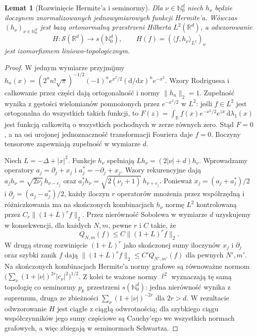 \documentclass[11pt,a4paper]{article}
\numberwithin{equation}{section}
\theoremstyle{plain}
\newtheorem{lemat}[twierdzenie]{Lemat}
\theoremstyle{definition}
\theoremstyle{remark}
\newcommand{\R}{\mathbb R}
\newcommand{\N}{\mathbb N}
\begin{document}
\begin{lemat}[Rozwinięcie Hermite'a i seminormy]
\label{lem:hermite-schwartz23}
Dla $\nu\in\N_0^d$ niech $h_\nu$ będzie iloczynem
znormalizowanych jednowymiarowych funkcji Hermite'a.
Wówczas $(h_\nu)_{\nu\in\N_0^d}$ jest bazą ortonormalną
przestrzeni Hilberta $L^2(\R^d)$, a odwzorowanie
\[
 H:\mathcal S(\R^d)\to s(\N_0^d),\qquad
 H(f)=(\langle f,h_\nu\rangle_{L^2})_\nu
\]
jest izomorfizmem liniowo-topologicznym.
\end{lemat}
\begin{proof}
W jednym wymiarze przyjmijmy
$h_n(x)=(2^n n!\sqrt\pi)^{-1/2}
(-1)^n e^{x^2/2}(\mathrm d/\mathrm dx)^n e^{-x^2}$.
Wzory Rodriguesa i całkowanie przez części dają
ortogonalność i normy $\|h_n\|_2=1$.
Zupełność wynika z gęstości wielomianów pomnożonych
przez $e^{-x^2/2}$ w $L^2$: jeśli $f\in L^2$ jest
ortogonalna do wszystkich takich funkcji, to
$F(z)=\int_{\R} f(x)e^{-x^2/2}e^{zx}\,\mathrm d\lambda_1(x)$
jest funkcją całkowitą o wszystkich pochodnych w zerze
równych zero. Stąd $F=0$, a na osi urojonej
jednoznaczność transformacji Fouriera daje $f=0$.
Iloczyny tensorowe zapewniają zupełność w wymiarze $d$.

Niech $L=-\Delta+|x|^2$. Funkcje $h_\nu$ spełniają
$Lh_\nu=(2|\nu|+d)h_\nu$.
Wprowadzamy operatory
$a_j=\partial_j+x_j$ i $a_j^*=-\partial_j+x_j$.
Wzory rekurencyjne dają
$a_jh_\nu=\sqrt{2\nu_j}\,h_{\nu-e_j}$ oraz
$a_j^*h_\nu=\sqrt{2(\nu_j+1)}\,h_{\nu+e_j}$.
Ponieważ $x_j=(a_j+a_j^*)/2$ i
$\partial_j=(a_j-a_j^*)/2$, każdy iloczyn $r$
operatorów mnożenia przez współrzędną i różniczkowania
ma na skończonych kombinacjach $h_\nu$ normę $L^2$
kontrolowaną przez $C_r\|(1+L)^r f\|_2$.
Przez nierówność Sobolewa w wymiarze $d$ uzyskujemy
w konsekwencji, dla każdych $N,m$, pewne $r$ i $C$ takie, że
\[
 Q_{N,m}(f)\le C\|(1+L)^r f\|_2.
\]
W drugą stronę rozwinięcie $(1+L)^r$ jako skończonej
sumy iloczynów $x_j$ i $\partial_j$ oraz szybki zanik
$f$ dają $\|(1+L)^r f\|_2\le C'Q_{N',m'}(f)$
dla pewnych $N',m'$. Na skończonych kombinacjach
Hermite'a normy grafowe są równoważne normom
$\big(\sum_\nu(1+|\nu|)^{2r}|c_\nu|^2\big)^{1/2}$.
Z kolei te ważone normy $\ell^2$ wyznaczają tę samą
topologię co seminormy $p_k$ przestrzeni $s(\N_0^d)$:
jedna nierówność wynika z supremum, druga ze zbieżności
$\sum_\nu(1+|\nu|)^{-2r}$ dla $2r>d$.
W rezultacie odwzorowanie $H$ jest ciągłe z ciągłą
odwrotnością; dla szybkiego ciągu współczynników
jego sumy częściowe są Cauchy'ego we wszystkich normach
grafowych, a więc zbiegają w seminormach Schwartza.
\end{proof}
\end{document}
